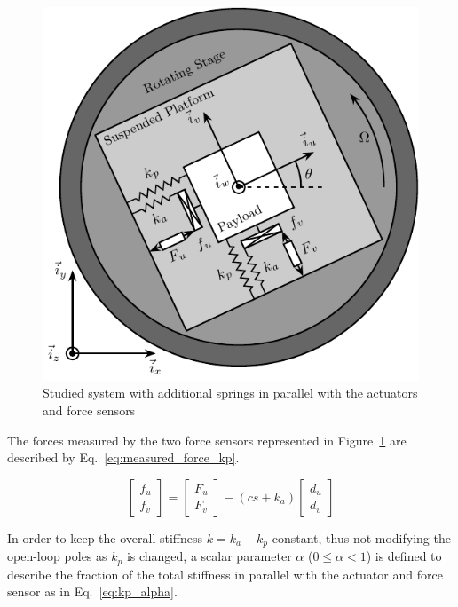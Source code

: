 \documentclass[10pt]{iopart}
\begin{document}
\begin{figure}[htbp]
\centering
\includegraphics[scale=1,scale=0.9]{figs/fig12.pdf}
\caption{\label{fig:system_parallel_springs}Studied system with additional springs in parallel with the actuators and force sensors}
\end{figure}

\par
The forces measured by the two force sensors represented in Figure~\ref{fig:system_parallel_springs} are described by Eq.~\eqref{eq:measured_force_kp}.

\begin{equation}
\label{eq:measured_force_kp}
  \begin{bmatrix} f_{u} \\ f_{v} \end{bmatrix} =
  \begin{bmatrix} F_u \\ F_v \end{bmatrix} - (c s + k_a)
  \begin{bmatrix} d_u \\ d_v \end{bmatrix}
\end{equation}

In order to keep the overall stiffness \(k = k_a + k_p\) constant, thus not modifying the open-loop poles as \(k_p\) is changed, a scalar parameter \(\alpha\) (\(0 \le \alpha < 1\)) is defined to describe the fraction of the total stiffness in parallel with the actuator and force sensor as in Eq.~\eqref{eq:kp_alpha}.
\end{document}
